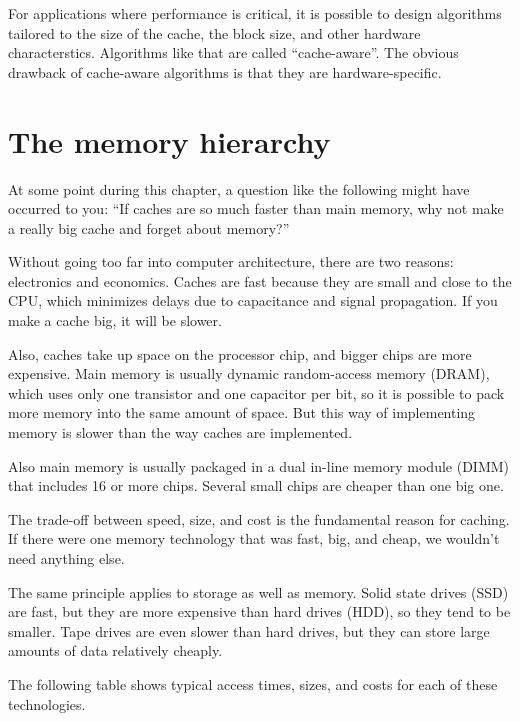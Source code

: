 \documentclass[12pt]{book}
\begin{document}
{For applications where performance is critical, it is possible
to design algorithms tailored to the size of the cache, the block size,
and other hardware characterstics.  Algorithms like that are
called ``cache-aware''.  The obvious drawback of cache-aware
algorithms is that they are hardware-specific.


\section{The memory hierarchy}

At some point during this chapter, a question like the following
might have occurred to you: ``If caches are so much faster than
main memory, why not make a really big cache and forget about
memory?''

Without going too far into computer architecture, there are two
reasons: electronics and economics.  Caches are fast because they are
small and close to the CPU, which minimizes delays due to capacitance
and signal propagation.  If you make a cache big, it will be slower.

Also, caches take up space on the processor chip, and bigger chips are
more expensive.  Main memory is usually dynamic random-access memory
(DRAM), which uses only one transistor and one capacitor per bit, so
it is possible to pack more memory into the same amount of space.  But
this way of implementing memory is slower than the way caches are
implemented.
 
Also main memory is usually packaged in a dual in-line memory module
(DIMM) that includes 16 or more chips.  Several small chips are cheaper
than one big one.

The trade-off between speed, size, and cost is the fundamental reason
for caching.  If there were one memory technology that was fast,
big, and cheap, we wouldn't need anything else.

The same principle applies to storage as well as memory.  Solid state drives (SSD) are fast, but they are more expensive than hard drives (HDD), so they tend to be smaller.  Tape drives are even slower than hard
drives, but they can store large amounts of data relatively
cheaply.

The following table shows typical access times, sizes, and 
costs for each of these technologies.  

}
\end{document}
